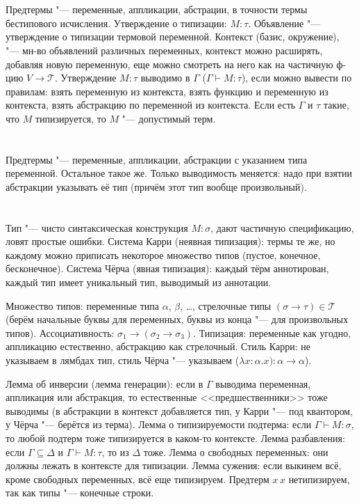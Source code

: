 \section{} %
Предтермы "--- переменные, аппликации, абстрации, в точности термы бестипового исчисления.
Утверждение о типизации: $M \colon \tau$.
Объявление "--- утверждение о типизации термовой переменной.
Контекст (базис, окружение), "--- мн-во объявлений различных переменных, контекст можно расширять,
добавляя новую переменную, еще можно смотреть на него как на частичную ф-цию $V \to \mathcal T$.
Утверждение $M\colon \tau$ выводимо в $\Gamma$ ($\Gamma \vdash M \colon \tau$), если можно вывести
по правилам: взять переменную из контекста, взять функцию и переменную из контекста, взять абстракцию по переменной из контекста.
Если есть $\Gamma$ и $\tau$ такие, что $M$ типизируется, то $M$ "--- допустимый терм.

\section{} %
Предтермы "--- переменные, аппликации, абстракции с указанием типа переменной.
Остальное такое же.
Только выводимость меняется: надо при взятии абстракции указывать её тип (причём этот тип вообще произвольный).

\section{} %
Тип "--- чисто синтаксическая конструкция $M \colon \sigma$,
дают частичную спецификацию, ловят простые ошибки.
Система Карри (неявная типизация): термы те же, но каждому можно приписать некоторое множество типов (пустое, конечное, бесконечное).
Система Чёрча (явная типизация): каждый тёрм аннотирован, каждый тип имеет уникальный тип, выводимый из аннотации.

Множество типов: переменные типа $\alpha$, $\beta$, \dots, стрелочные типы $(\sigma \to \tau) \in \mathcal T$
(берём начальные буквы для переменных, буквы из конца "--- для произвольных типов).
Ассоциативность: $\sigma_1 \to (\sigma_2 \to \sigma_3)$.
Типизация: переменные как угодно, аппликацию естественно, абстракцию как стрелочный.
Стиль Карри: не указываем в лямбдах тип, стиль Чёрча "--- указываем ($\lambda x \colon \alpha . x) \colon \alpha \to \alpha$).

Лемма об инверсии (лемма генерации): если в $\Gamma$ выводима переменная, аппликация или абстракция, то естественные <<предшественники>>
тоже выводимы (в абстракции в контекст добавляется тип, у Карри "--- под квантором, у Чёрча "--- берётся из терма).
Лемма о типизируемости подтерма: если $\Gamma \vdash M \colon \sigma$, то любой подтерм тоже типизируется в каком-то контексте.
Лемма разбавления: если $\Gamma \subseteq \Delta$ и $\Gamma \vdash M \colon \tau$, то из $\Delta$ тоже.
Лемма о свободных переменных: они должны лежать в контексте для типизации.
Лемма сужения: если выкинем всё, кроме свободных переменных, всё еще типизируем.
Предтерм $x\,x$ нетипизируем, так как типы "--- конечные строки.

